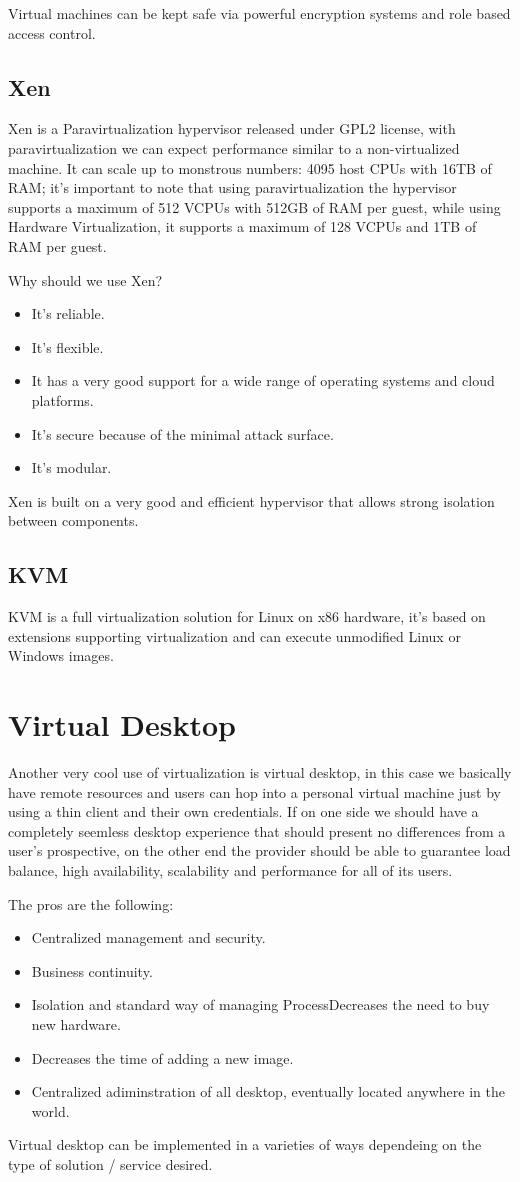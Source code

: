Virtual machines can be kept safe via powerful encryption systems and role based access control.
\subsection{Xen}
Xen is a Paravirtualization hypervisor released under GPL2 license, with paravirtualization we can expect performance similar to a non-virtualized machine. It can scale up to monstrous numbers: 4095 host CPUs with 16TB of RAM; it's important to note that using paravirtualization the hypervisor supports a maximum of 512 VCPUs with 512GB of RAM per guest, while using Hardware Virtualization, it supports a maximum of 128 VCPUs and 1TB of RAM per guest.

Why should we use Xen?
\begin{itemize}
    \item It's reliable.
    \item It's flexible.
    \item It has a very good support for a wide range of operating systems and cloud platforms.
    \item It's secure because of the minimal attack surface.
    \item It's modular.
\end{itemize}
Xen is built on a very good and efficient hypervisor that allows strong isolation between components.
\subsection{KVM}
KVM is a full virtualization solution for Linux on x86 hardware, it's based on extensions supporting virtualization and can execute unmodified Linux or Windows images.
\section{Virtual Desktop}
Another very cool use of virtualization is virtual desktop, in this case we basically have remote resources and users can hop into a personal virtual machine just by using a thin client and their own credentials. If on one side we should have a completely seemless desktop experience that should present no differences from a user's prospective, on the other end the provider should be able to guarantee load balance, high availability, scalability and performance for all of its users.

The pros are the following:
\begin{itemize}
    \item Centralized management and security.
    \item Business continuity.
    \item Isolation and standard way of managing ProcessDecreases the need to buy new hardware.
    \item Decreases the time of adding a new image.
    \item Centralized adiminstration of all desktop, eventually located anywhere in the world.
\end{itemize}
Virtual desktop can be implemented in a varieties of ways dependeing on the type of solution / service desired.

